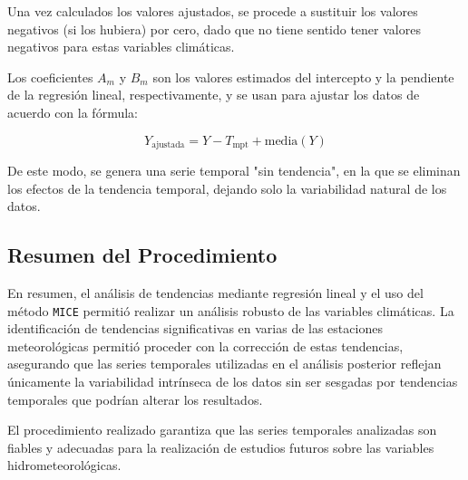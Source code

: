 Una vez calculados los valores ajustados, se procede a sustituir los valores negativos (si los hubiera) por cero, dado que no tiene sentido tener valores negativos para estas variables climáticas.

Los coeficientes \( A_m \) y \( B_m \) son los valores estimados del intercepto y la pendiente de la regresión lineal, respectivamente, y se usan para ajustar los datos de acuerdo con la fórmula:

\[
Y_{\text{ajustada}} = Y - T_{\text{mpt}} + \text{media}(Y)
\]


De este modo, se genera una serie temporal "sin tendencia", en la que se eliminan los efectos de la tendencia temporal, dejando solo la variabilidad natural de los datos.

\subsection{Resumen del Procedimiento}

En resumen, el análisis de tendencias mediante regresión lineal y el uso del método \texttt{MICE} permitió realizar un análisis robusto de las variables climáticas. La identificación de tendencias significativas en varias de las estaciones meteorológicas permitió proceder con la corrección de estas tendencias, asegurando que las series temporales utilizadas en el análisis posterior reflejan únicamente la variabilidad intrínseca de los datos sin ser sesgadas por tendencias temporales que podrían alterar los resultados.

El procedimiento realizado garantiza que las series temporales analizadas son fiables y adecuadas para la realización de estudios futuros sobre las variables hidrometeorológicas.

